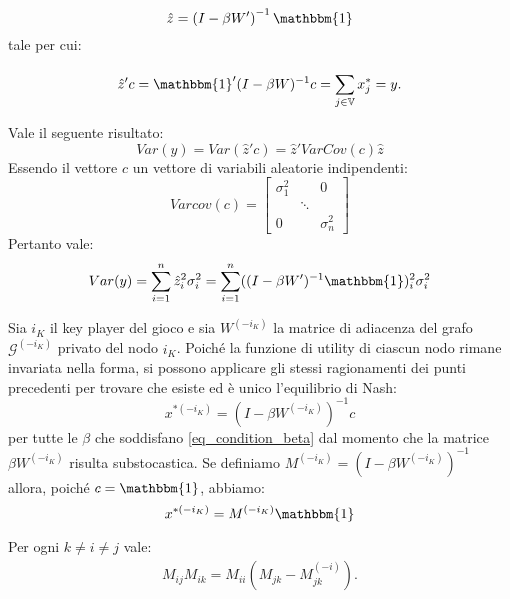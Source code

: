 \begin{alphaparts}
    \begin{equation}\label{eq_zhat}
        \hat{z} =\left(I - \beta W'\right)^{-1}\mathbbm{1}
    \end{equation}
    tale per cui:
    
    \begin{equation}\label{eq_yscalar}
        \hat{z}'c = \mathbbm{1}' (I - \beta W)^{-1} c =  \sum \limits_{j \in \mathbb{V}}^{} x^*_j = y.
    \end{equation}

    \questionpart
    Vale il seguente risultato:
    \[
    Var(y) = Var(\hat{z}'c) = \hat{z}'VarCov(c)\hat{z}    
    \]
    Essendo il vettore \(c\) un vettore di variabili aleatorie indipendenti:
    \[
    Varcov(c) = \begin{bmatrix}
        \sigma_1^2 & & 0 \\
         & \ddots & \\
         0 & & \sigma_n^2
    \end{bmatrix}    
    \]
    Pertanto vale:
    \[Var(y) =  \sum \limits_{i = 1}^{n} \hat{z}_i^2 \sigma_i^2 =  \sum \limits_{i = 1}^{n} ((I - \beta W')^{-1}\mathbbm{1})_i^2 \sigma_i^2\]

    \questionpart
    Sia \(i_K\) il key player del gioco e sia \(W^{(- i_K)}\) la matrice di adiacenza del grafo \(\mathcal{G}^{(- i_K)}\) privato del nodo \(i_K\). Poiché la funzione di utility di ciascun nodo rimane invariata nella forma, si possono applicare gli stessi ragionamenti dei punti precedenti per trovare che esiste ed è unico l'equilibrio di Nash:
    \[
    x^{*(- i_K)} = (I- \beta W^{(- i_K)})^{- 1}c  
    \]
    per tutte le \(\beta\) che soddisfano \eqref{eq_condition_beta} dal momento che la matrice \(\beta W^{(- i_K)}\) risulta substocastica. Se definiamo \(M^{(- i_K)} = (I- \beta W^{(- i_K)})^{- 1}\) allora, poiché \(c= \mathbbm{1}\), abbiamo: 
    \begin{equation}    
            x^{*(- i_K)} = M^{(- i_K)} \mathbbm{1}
    \end{equation}
    
    \questionpart
    Per ogni \(k \neq i \neq j\) vale:
    \begin{gather*}
        M_{ij}M_{ik} = M_{ii}(M_{jk}-M_{jk}^{(-i)}).
    \end{gather*}


\end{alphaparts}
